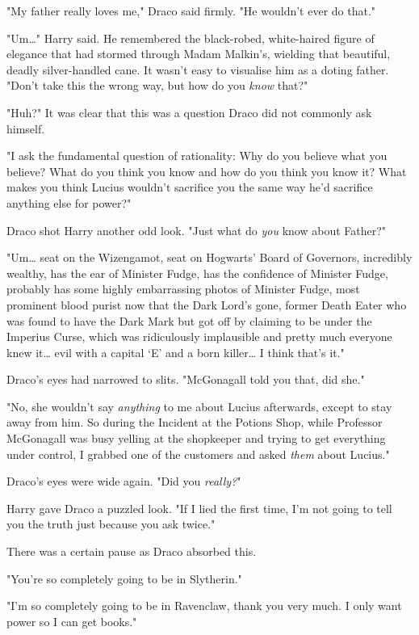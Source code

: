 "My father really loves me," Draco said firmly. "He wouldn't ever do that."

"Um{\ldots}" Harry said. He remembered the black-robed, white-haired figure of 
elegance that had stormed through Madam Malkin's, wielding that beautiful, 
deadly silver-handled cane. It wasn't easy to visualise him as a doting father. 
"Don't take this the wrong way, but how do you \emph{know} that?"

"Huh?" It was clear that this was a question Draco did not commonly ask himself.

"I ask the fundamental question of rationality: Why do you believe what you 
believe? What do you think you know and how do you think you know it? What 
makes you think Lucius wouldn't sacrifice you the same way he'd sacrifice 
anything else for power?"

Draco shot Harry another odd look. "Just what do \emph{you} know about Father?"

"Um{\ldots} seat on the Wizengamot, seat on Hogwarts' Board of Governors, 
incredibly wealthy, has the ear of Minister Fudge, has the confidence of 
Minister Fudge, probably has some highly embarrassing photos of Minister Fudge, 
most prominent blood purist now that the Dark Lord's gone, former Death Eater 
who was found to have the Dark Mark but got off by claiming to be under the 
Imperius Curse, which was ridiculously implausible and pretty much everyone 
knew it{\ldots} evil with a capital `E' and a born killer{\ldots} I think 
that's it."

Draco's eyes had narrowed to slits. "McGonagall told you that, did she."

"No, she wouldn't say \emph{anything} to me about Lucius afterwards, except to 
stay away from him. So during the Incident at the Potions Shop, while Professor 
McGonagall was busy yelling at the shopkeeper and trying to get everything 
under control, I grabbed one of the customers and asked \emph{them} about 
Lucius."

Draco's eyes were wide again. "Did you \emph{really?}"

Harry gave Draco a puzzled look. "If I lied the first time, I'm not going to 
tell you the truth just because you ask twice."

There was a certain pause as Draco absorbed this.

"You're so completely going to be in Slytherin."

"I'm so completely going to be in Ravenclaw, thank you very much. I only want 
power so I can get books."

